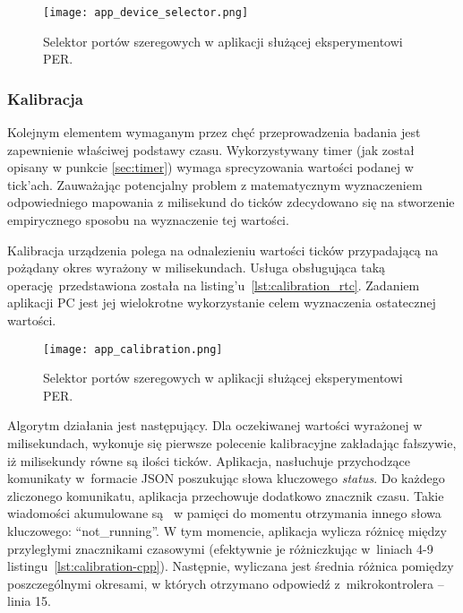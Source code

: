 \begin{figure}[!ht]
	\centering \texttt{[image: app\_device\_selector.png]}
	\caption{Selektor portów szeregowych w aplikacji służącej eksperymentowi PER.}
	\label{app_device_selector}
\end{figure}


\subsubsection{Kalibracja}
Kolejnym elementem wymaganym przez chęć przeprowadzenia badania jest zapewnienie
właściwej podstawy czasu. Wykorzystywany timer (jak został opisany w punkcie \ref{sec:timer})
wymaga sprecyzowania wartości podanej w tick'ach. Zauważając potencjalny problem
z matematycznym wyznaczeniem odpowiedniego mapowania z milisekund do ticków
zdecydowano się na stworzenie empirycznego sposobu na wyznaczenie tej wartości.

Kalibracja urządzenia polega na odnalezieniu wartości ticków przypadającą na pożądany okres
wyrażony w milisekundach. Usługa obsługująca taką operację przedstawiona została
na listing'u~\ref{lst:calibration_rtc}. Zadaniem aplikacji PC jest jej wielokrotne
wykorzystanie celem wyznaczenia ostatecznej wartości.

\begin{figure}[!ht]
	\centering \texttt{[image: app\_calibration.png]}
	\caption{Selektor portów szeregowych w aplikacji służącej eksperymentowi PER.}
	\label{app_calibration}
\end{figure}

Algorytm działania jest następujący. Dla oczekiwanej wartości wyrażonej w milisekundach,
wykonuje się pierwsze polecenie kalibracyjne zakładając fałszywie, iż milisekundy
równe są ilości ticków. Aplikacja, nasłuchuje przychodzące komunikaty w~formacie JSON
poszukując słowa kluczowego \textit{status}. Do każdego zliczonego komunikatu,
aplikacja przechowuje dodatkowo znacznik czasu. Takie wiadomości akumulowane są 
w pamięci do momentu otrzymania innego słowa kluczowego: \enquote{not\_running}. W tym momencie,
aplikacja wylicza różnicę między przyległymi znacznikami czasowymi (efektywnie je różniczkując
w~liniach 4-9 listingu~\ref{lst:calibration-cpp}). Następnie, wyliczana jest
średnia różnica pomiędzy poszczególnymi okresami, w których otrzymano odpowiedź 
z~mikrokontrolera -- linia 15.

